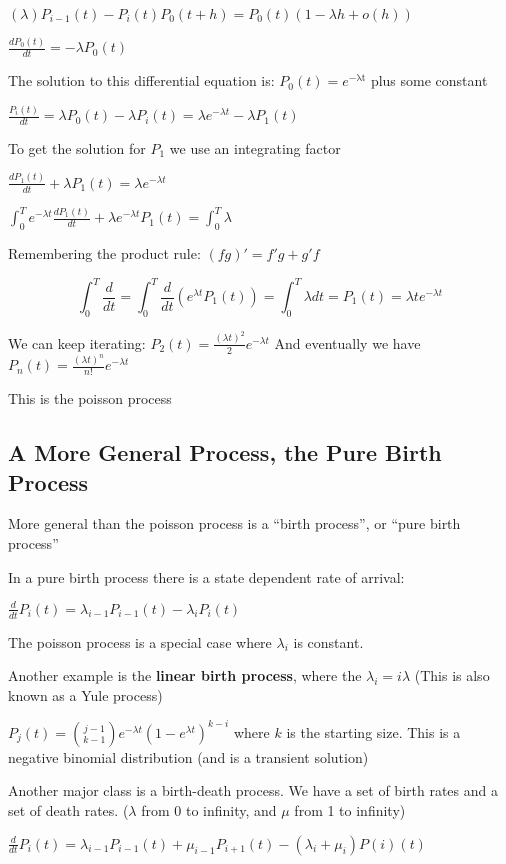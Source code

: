 \documentclass[12pt]{report}
\begin{document}
$(\lambda )P_{i-1}(t) -P_i(t) P_0(t+h)=P_0(t)(1-\lambda h + o(h))$

 $\frac{d P_0(t)}{dt}= -\lambda P_0(t)$
 
The solution to this differential equation is:
$P_0(t)= e^{\mathrm{-\lambda t}}$ plus some constant

$\frac{P_i(t)}{dt}=\lambda P_0(t) -\lambda P_i(t)=\lambda e^{-\lambda t} -\lambda P_1(t)$

To get the solution for $P_1$ we use an integrating factor

$\frac{d P_1(t)}{dt} + \lambda P_1(t) = \lambda e^{-\lambda t}$

$\int_0^T e^{-\lambda t} \frac{d P_1(t)}{dt} + \lambda e^{-\lambda t} P_1(t) = \int_0^T \lambda$

Remembering the product rule: $(fg)'=f'g+g'f$

$$ \int_0^T \frac{d}{dt} = \int_0^T \frac{d}{dt} ( e^{\lambda t} P_1(t)) = \int_0^T \lambda dt = P_1(t)=\lambda t e^{-\lambda t}$$


We can keep iterating:
$P_2(t)= \frac{(\lambda t)^2}{2} e^{-\lambda t}$
And eventually we have 
$P_n(t) = \frac{(\lambda t)^n}{n!} e^{-\lambda t}$

This is the poisson process
\subsection{A More General Process, the Pure Birth Process}
\label{sec-1-2}

More general than the poisson process is a ``birth process'', or ``pure birth process''

In a pure birth process there is a state dependent rate of arrival:

$\frac{d}{dt} P_i(t) = \lambda_{i-1} P_{i-1}(t) -\lambda_i P_i(t)$

The poisson process is a special case where $\lambda_i$ is constant.

Another example is the \textbf{linear birth process}, where the $\lambda_i=i \lambda$ (This is also known as a Yule process)

$P_j(t) = {{j-1}\choose{k-1}} e^{-\lambda t} (1-e^{\lambda t})^{k-i}$ where $k$ is the starting size.  This is a negative binomial distribution (and is a transient solution)

Another major class is a birth-death process.  We have a set of birth rates and a set of death rates. ($\lambda$ from 0 to infinity, and $\mu$ from 1 to infinity)

$\frac{d}{dt} P_i(t) = \lambda_{i-1} P_{i-1}(t) + \mu_{i-1}P_{i+1}(t) - (\lambda_i + \mu_i)P(i)(t)$
\end{document}
